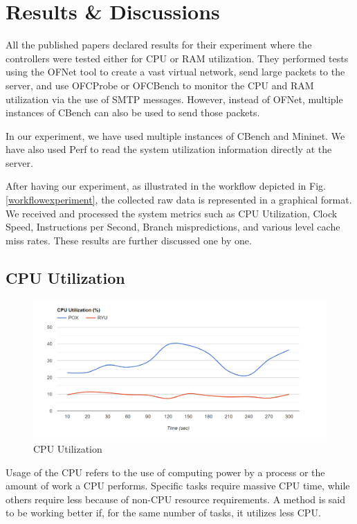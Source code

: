 \chapter{Results \& Discussions}

All the published papers declared results for their experiment where the controllers were tested either for CPU or RAM utilization. They performed tests using the OFNet tool to create a vast virtual network, send large packets to the server, and use OFCProbe or OFCBench to monitor the CPU and RAM utilization via the use of SMTP messages. However, instead of OFNet, multiple instances of CBench can also be used to send those packets.

In our experiment, we have used multiple instances of CBench and Mininet. We have also used Perf to read the system utilization information directly at the server.

After having our experiment, as illustrated in the workflow depicted in Fig. \ref{workflowexperiment}, the collected raw data is represented in a graphical format. We received and processed the system metrics such as CPU Utilization, Clock Speed, Instructions per Second, Branch mispredictions, and various level cache miss rates. These results are further discussed one by one.

\section{CPU Utilization}

\begin{figure}[!hbt]
    \centering
        \includegraphics[width=\textwidth,keepaspectratio]{images/cpu_utilization.png}
       \caption{CPU Utilization}
        \label{CPUutilization}
\end{figure}

Usage of the CPU refers to the use of computing power by a process or the amount of work a CPU performs. Specific tasks require massive CPU time, while others require less because of non-CPU resource requirements. A method is said to be working better if, for the same number of tasks, it utilizes less CPU.

